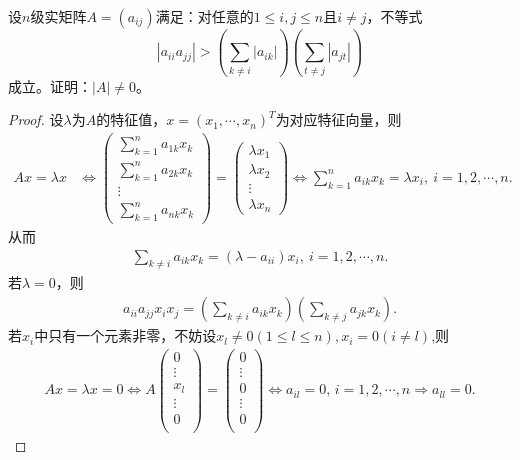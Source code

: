 \documentclass[../../main.tex]{subfiles}%
\begin{document}
\begin{example}
设$n$级实矩阵$A=(a_{ij})$满足：对任意的$1\leqslant i,j\leqslant n$且$i\neq j$，不等式$$|a_{ii}a_{jj}|>\left( \sum\limits_{k\neq i}|a_{ik}| \right)\left( \sum\limits_{t\neq j}|a_{jt}| \right)$$成立。证明：$|A|\neq 0$。
\end{example}
\begin{proof}
设$\lambda$为$A$的特征值，$x=(x_1,\cdots,x_n)^T$为对应特征向量，则
\begin{align*}
Ax=\lambda x&\Longleftrightarrow \begin{pmatrix}
\sum\limits_{k=1}^n a_{1k}x_k\\
\sum\limits_{k=1}^n a_{2k}x_k\\
\vdots\\
\sum\limits_{k=1}^n a_{nk}x_k
\end{pmatrix} = \begin{pmatrix}
\lambda x_1\\
\lambda x_2\\
\vdots\\
\lambda x_n
\end{pmatrix} \Longleftrightarrow \sum\limits_{k=1}^n a_{ik}x_k=\lambda x_i,\ i=1,2,\cdots,n.
\end{align*}
从而
\begin{align*}
\sum\limits_{k\ne i} a_{ik}x_k=(\lambda -a_{ii})x_i,\ i=1,2,\cdots,n.
\end{align*}
若$\lambda=0$，则
\begin{align}
a_{ii}a_{jj}x_ix_j=\left( \sum\limits_{k\ne i} a_{ik}x_k \right)\left( \sum\limits_{k\ne j} a_{jk}x_k \right). \label{eq::::---823hfheofgu3894f34gxzz1}
\end{align}
若$x_i$中只有一个元素非零，不妨设$x_l\neq 0(1\leqslant l\leqslant n),x_i=0(i\neq l)$,则
\begin{align*}
Ax=\lambda x=0\Longleftrightarrow A\left( \begin{array}{c}
0\\
\vdots\\
x_l\\
\vdots\\
0\\
\end{array} \right) =\left( \begin{array}{c}
0\\
\vdots\\
0\\
\vdots\\
0\\
\end{array} \right) \Longleftrightarrow a_{il}=0,\,i=1,2,\cdots ,n\Longrightarrow a_{ll}=0.

\end{align*}
\end{proof}
\end{document}
